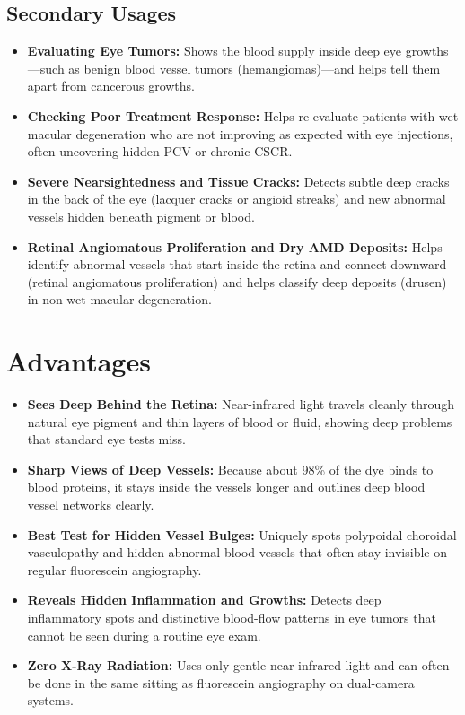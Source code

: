 \subsection{Secondary Usages}

\begin{itemize}
    \item \textbf{Evaluating Eye Tumors:} Shows the blood supply inside deep eye growths---such as benign blood vessel tumors (hemangiomas)---and helps tell them apart from cancerous growths.
    \item \textbf{Checking Poor Treatment Response:} Helps re-evaluate patients with wet macular degeneration who are not improving as expected with eye injections, often uncovering hidden PCV or chronic CSCR.
    \item \textbf{Severe Nearsightedness and Tissue Cracks:} Detects subtle deep cracks in the back of the eye (lacquer cracks or angioid streaks) and new abnormal vessels hidden beneath pigment or blood.
    \item \textbf{Retinal Angiomatous Proliferation and Dry AMD Deposits:} Helps identify abnormal vessels that start inside the retina and connect downward (retinal angiomatous proliferation) and helps classify deep deposits (drusen) in non-wet macular degeneration.
\end{itemize}

\section{Advantages}

\begin{itemize}
    \item \textbf{Sees Deep Behind the Retina:} Near-infrared light travels cleanly through natural eye pigment and thin layers of blood or fluid, showing deep problems that standard eye tests miss.
    \item \textbf{Sharp Views of Deep Vessels:} Because about 98\% of the dye binds to blood proteins, it stays inside the vessels longer and outlines deep blood vessel networks clearly.
    \item \textbf{Best Test for Hidden Vessel Bulges:} Uniquely spots polypoidal choroidal vasculopathy and hidden abnormal blood vessels that often stay invisible on regular fluorescein angiography.
    \item \textbf{Reveals Hidden Inflammation and Growths:} Detects deep inflammatory spots and distinctive blood-flow patterns in eye tumors that cannot be seen during a routine eye exam.
    \item \textbf{Zero X-Ray Radiation:} Uses only gentle near-infrared light and can often be done in the same sitting as fluorescein angiography on dual-camera systems.
\end{itemize}

